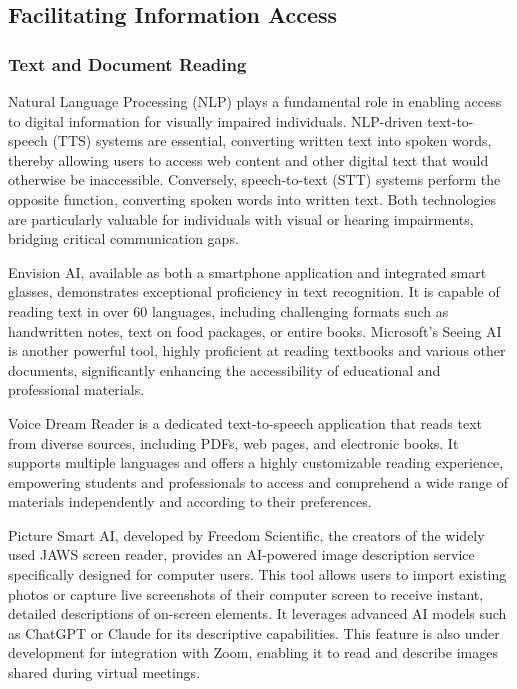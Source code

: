 \subsection{Facilitating Information Access}

\subsubsection{Text and Document Reading}

Natural Language Processing (NLP) plays a fundamental role in enabling access to digital information for visually impaired individuals. NLP-driven text-to-speech (TTS) systems are essential, converting written text into spoken words, thereby allowing users to access web content and other digital text that would otherwise be inaccessible. Conversely, speech-to-text (STT) systems perform the opposite function, converting spoken words into written text. Both technologies are particularly valuable for individuals with visual or hearing impairments, bridging critical communication gaps. \cite{arxiv2503, numberanalytics2024}

Envision AI, available as both a smartphone application and integrated smart glasses, demonstrates exceptional proficiency in text recognition. It is capable of reading text in over 60 languages, including challenging formats such as handwritten notes, text on food packages, or entire books. \cite{accessiblepharmacy2024, envision} Microsoft's Seeing AI is another powerful tool, highly proficient at reading textbooks and various other documents, significantly enhancing the accessibility of educational and professional materials. \cite{accessiblepharmacy2024, msseeingai}

Voice Dream Reader is a dedicated text-to-speech application that reads text from diverse sources, including PDFs, web pages, and electronic books. It supports multiple languages and offers a highly customizable reading experience, empowering students and professionals to access and comprehend a wide range of materials independently and according to their preferences. \cite{victastudents2024}

Picture Smart AI, developed by Freedom Scientific, the creators of the widely used JAWS screen reader, provides an AI-powered image description service specifically designed for computer users. This tool allows users to import existing photos or capture live screenshots of their computer screen to receive instant, detailed descriptions of on-screen elements. It leverages advanced AI models such as ChatGPT or Claude for its descriptive capabilities. This feature is also under development for integration with Zoom, enabling it to read and describe images shared during virtual meetings. \cite{accessiblepharmacy2024}


